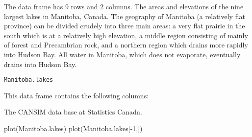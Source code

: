 \begin{Description}\relax
The  data frame has 9 rows and 2 columns.
The areas and elevations of the nine largest lakes in
Manitoba, Canada.  The geography of Manitoba (a relatively
flat province) can be divided crudely into three main
areas: a very flat prairie in the south which is at a 
relatively high elevation, a middle region consisting
of mainly of forest and Precambrian rock, and a northern
region which drains more rapidly into Hudson
Bay.  All water in Manitoba, which does not evaporate, eventually drains 
into Hudson Bay.
\end{Description}
\begin{Usage}
\begin{verbatim}Manitoba.lakes\end{verbatim}
\end{Usage}
\begin{Format}\relax
This data frame contains the following columns:
\end{Format}
\begin{Source}\relax
The CANSIM data base at Statistics Canada.
\end{Source}
\begin{Examples}
\begin{ExampleCode}
plot(Manitoba.lakes)
plot(Manitoba.lakes[-1,])
\end{ExampleCode}
\end{Examples}

